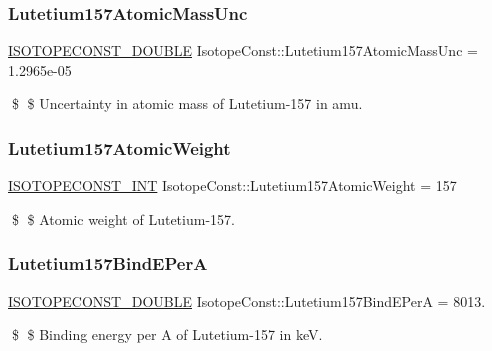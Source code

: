 \subsubsection{\texorpdfstring{Lutetium157\+Atomic\+Mass\+Unc}{Lutetium157AtomicMassUnc}}
{\footnotesize\ttfamily \mbox{\hyperlink{group___isotope_const-_macros_ga8f45a7272ce02c0b4c65c44636ed719a}{I\+S\+O\+T\+O\+P\+E\+C\+O\+N\+S\+T\+\_\+\+D\+O\+U\+B\+LE}} Isotope\+Const\+::\+Lutetium157\+Atomic\+Mass\+Unc = 1.\+2965e-\/05}

\$ \$ Uncertainty in atomic mass of Lutetium-\/157 in amu. \mbox{\label{group___isotope_const-_lutetium-_lu157_gadb5740b1f56073cc43e453677db4510f}} 
\subsubsection{\texorpdfstring{Lutetium157\+Atomic\+Weight}{Lutetium157AtomicWeight}}
{\footnotesize\ttfamily \mbox{\hyperlink{group___isotope_const-_macros_ga5f18360b3e99483a35c32d789e62621c}{I\+S\+O\+T\+O\+P\+E\+C\+O\+N\+S\+T\+\_\+\+I\+NT}} Isotope\+Const\+::\+Lutetium157\+Atomic\+Weight = 157}

\$ \$ Atomic weight of Lutetium-\/157. \mbox{\label{group___isotope_const-_lutetium-_lu157_ga462379fb155a6fc53283b92564e4eac6}} 
\subsubsection{\texorpdfstring{Lutetium157\+Bind\+E\+PerA}{Lutetium157BindEPerA}}
{\footnotesize\ttfamily \mbox{\hyperlink{group___isotope_const-_macros_ga8f45a7272ce02c0b4c65c44636ed719a}{I\+S\+O\+T\+O\+P\+E\+C\+O\+N\+S\+T\+\_\+\+D\+O\+U\+B\+LE}} Isotope\+Const\+::\+Lutetium157\+Bind\+E\+PerA = 8013.}

\$ \$ Binding energy per A of Lutetium-\/157 in keV. \mbox{\label{group___isotope_const-_lutetium-_lu157_gaa732378ce091ecb31e1f0983d9542c47}} 
